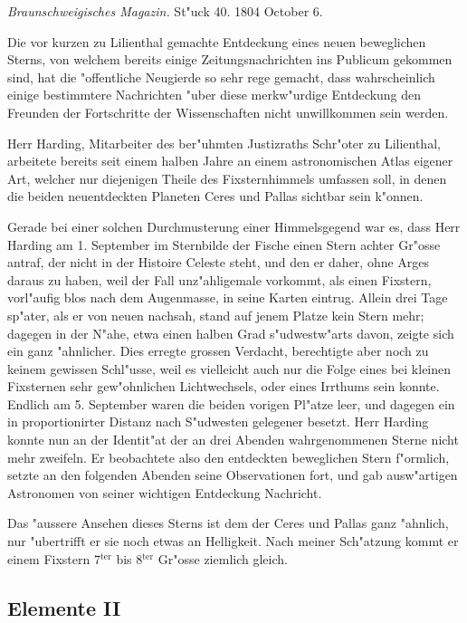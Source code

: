 \documentclass[12pt,a4paper]{article}
\begin{document}
\textit{Braunschweigisches Magazin.} St"uck 40. 1804 October 6.

Die vor kurzen zu Lilienthal gemachte Entdeckung eines neuen beweglichen Sterns, von welchem bereits einige Zeitungsnachrichten ins Publicum gekommen sind, hat die "offentliche Neugierde so sehr rege gemacht, dass wahrscheinlich einige bestimmtere Nachrichten "uber diese merkw"urdige Entdeckung den Freunden der Fortschritte der Wissenschaften nicht unwillkommen sein werden.

Herr Harding, Mitarbeiter des ber"uhmten Justizraths Schr"oter zu Lilienthal, arbeitete bereits seit einem halben Jahre an einem astronomischen Atlas eigener Art, welcher nur diejenigen Theile des Fixsternhimmels umfassen soll, in denen die beiden neuentdeckten Planeten Ceres und Pallas sichtbar sein k"onnen.

Gerade bei einer solchen Durchmusterung einer Himmelsgegend war es, dass Herr Harding am 1. September im Sternbilde der Fische einen Stern achter Gr"osse antraf, der nicht in der Histoire Celeste steht, und den er daher, ohne Arges daraus zu haben, weil der Fall unz"ahligemale vorkommt, als einen Fixstern, vorl"aufig blos nach dem Augenmasse, in seine Karten eintrug. Allein drei Tage sp"ater, als er von neuen nachsah, stand auf jenem Platze kein Stern mehr; dagegen in der N"ahe, etwa einen halben Grad s"udwestw"arts davon, zeigte sich ein ganz "ahnlicher. Dies erregte grossen Verdacht, berechtigte aber noch zu keinem gewissen Schl"usse, weil es vielleicht auch nur die Folge eines bei kleinen Fixsternen sehr gew"ohnlichen Lichtwechsels, oder eines Irrthums sein konnte. Endlich am 5. September waren die beiden vorigen Pl"atze leer, und dagegen ein in proportionirter Distanz nach S"udwesten gelegener besetzt. Herr Harding konnte nun an der Identit"at der an drei Abenden wahrgenommenen Sterne nicht mehr zweifeln. Er beobachtete also den entdeckten beweglichen Stern f"ormlich, setzte an den folgenden Abenden seine Observationen fort, und gab ausw"artigen Astronomen von seiner wichtigen Entdeckung Nachricht.

Das "aussere Ansehen dieses Sterns ist dem der Ceres und Pallas ganz "ahnlich, nur "ubertrifft er sie noch etwas an Helligkeit. Nach meiner Sch"atzung kommt er einem Fixstern 7$^\text{ter}$ bis 8$^\text{ter}$ Gr"osse ziemlich gleich.

\subsection{Elemente II}
\end{document}
